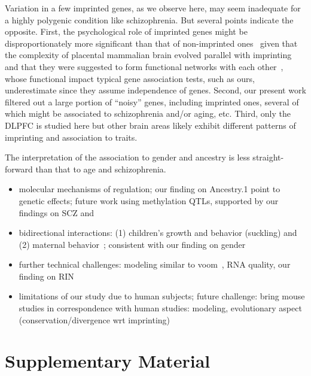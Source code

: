 \documentclass[letterpaper]{article}
\begin{document}
Variation in a few imprinted genes, as we observe here, may seem inadequate
for a highly polygenic condition like schizophrenia.  But several points
indicate the opposite.  First, the psychological role of imprinted genes might
be disproportionately more significant than that of non-imprinted
ones~\cite{Crespi2008a} given that the complexity of placental mammalian brain
evolved parallel with imprinting~\cite{Renfree2012} and that they were
suggested to form functional networks with each other~\cite{Varrault2006},
whose functional impact typical gene association tests, such as ours,
underestimate since they assume independence of genes.  Second, our present
work filtered out a large portion of ``noisy'' genes, including imprinted
ones, several of which might be associated to schizophrenia and/or aging, etc.
Third, only the DLPFC is studied here but other brain areas likely exhibit
different patterns of imprinting and association to traits.

The interpretation of the association to gender and ancestry is less
straight-forward than that to age and schizophrenia.

\begin{itemize}
\item molecular mechanisms of regulation; our finding on Ancestry.1 point to
genetic effects; future work using methylation QTLs, supported by our findings
on SCZ and~\cite{Hannon2016}
\item bidirectional interactions: (1) children's growth and behavior
(suckling) and (2) maternal behavior~\cite{Keverne2015}; consistent with our finding on gender
\item further technical challenges: modeling similar to voom~\cite{Law2014}, RNA quality, our finding on RIN
\item limitations of our study due to human subjects; future challenge: bring mouse studies in
correspondence with human studies: modeling, evolutionary aspect
(conservation/divergence wrt imprinting)
\end{itemize}




\newpage

\section{Supplementary Material}

\newpage

\end{document}
